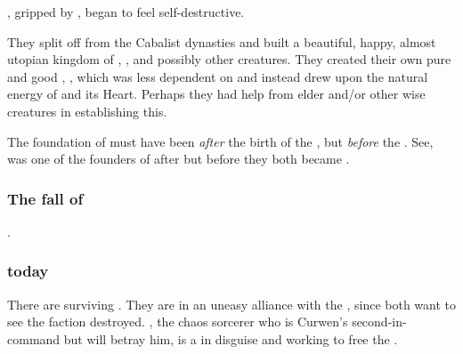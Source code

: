 
\Sithiyacaan, gripped by , began to feel self-destructive. 


They split off from the Cabalist dynasties and built a beautiful, happy, almost utopian kingdom of \resphain, \humans, \nephilim{} and possibly other creatures. 
They created their own pure and good \dweomer{}, \iquin, which was less dependent on \Erebos{} and instead drew upon the natural energy of \Miith{} and its Heart. 
Perhaps they had help from elder \ophidians{} and/or other wise creatures in establishing this. 

The foundation of \Kezerad{} must have been \emph{after} the birth of the \satharioth, but \emph{before} the . 
See,  was one of the founders of \Kezerad{} after  but before they both became \malachim. 





\subsubsection{The fall of \Kezerad}
\Kezerad{} . 





\subsubsection{\Kezeradi{} today}
There are surviving \Kezeradi. They are in an uneasy alliance with the , since both want to see the \bane{} faction destroyed. \Sanyor, the \scathaese{} chaos sorcerer who is Curwen's second-in-command but will betray him, is a \cuezcan{} in disguise and working to free the \Sephiroth. 

